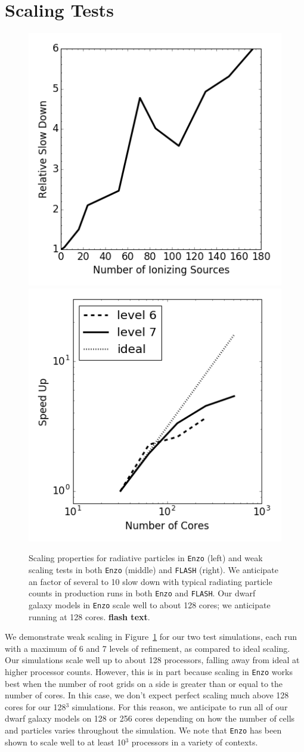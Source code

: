 \documentclass[11pt]{article}
\begin{document}
\section{Scaling Tests}

\begin{figure}
\centering
\includegraphics[width=0.32\linewidth]{enzo_radiation}
\includegraphics[width=0.32\linewidth]{enzo_scaling}
\caption{\small Scaling properties for radiative particles in \texttt{Enzo} (left) and weak scaling tests in both \texttt{Enzo} (middle) and \texttt{FLASH} (right). We anticipate an factor of several to 10 slow down with typical radiating particle counts in production runs in both \texttt{Enzo} and \texttt{FLASH}. Our dwarf galaxy models in \texttt{Enzo} scale well to about 128 cores; we anticipate running at 128 cores. {\bf flash text}.}
\label{fig:radiation_and_scaling}
\end{figure}

We demonstrate weak scaling in Figure~\ref{fig:radiation_and_scaling} for our two test simulations, each run with a maximum of 6 and 7 levels of refinement, as compared to ideal scaling. Our simulations scale well up to about 128 processors, falling away from ideal at higher processor counts. However, this is in part because scaling in \texttt{Enzo} works best when the number of root grids on a side is greater than or equal to the number of cores. In this case, we don't expect perfect scaling much above 128 cores for our 128$^3$ simulations. For this reason, we anticipate to run all of our dwarf galaxy models on 128 or 256 cores depending on how the number of cells and particles varies throughout the simulation. We note that \texttt{Enzo} has been shown to scale well to at least 10$^3$ processors in a variety of contexts.
\end{document}
